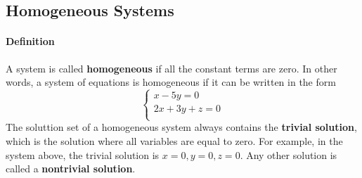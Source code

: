 \subsection{Homogeneous Systems}
\hrulefill

\paragraph*{Definition} A system is called \textbf{homogeneous} if all the constant terms are zero. In other words, a system of equations is homogeneous if it can be written in the form
\[\begin{cases}
    x-5y = 0 \\
    2x+3y+z = 0 \\
\end{cases}
\]
The soluttion set of a homogeneous system always contains the \textbf{trivial solution}, which is the solution where all variables are equal to zero. 
For example, in the system above, the trivial solution is \(x=0, y=0, z=0\).  Any other solution is called a \textbf{nontrivial solution}.

